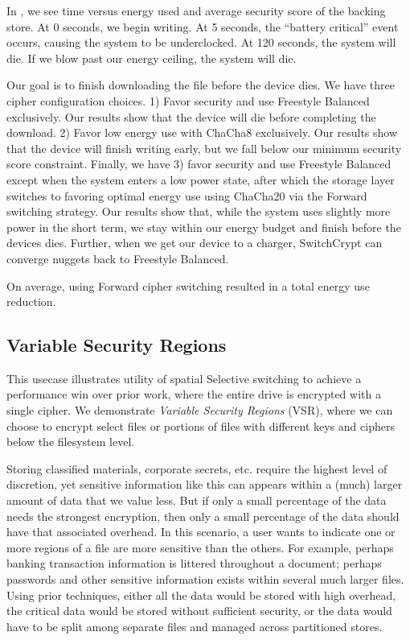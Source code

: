 In , we see time versus energy used and average security
score of the backing store. At 0 seconds, we begin writing. At 5 seconds, the
``battery critical'' event occurs, causing the system to be underclocked. At 120
seconds, the system will die. If we blow past our energy ceiling, the system
will die.

Our goal is to finish downloading the file before the device dies. We have three
cipher configuration choices. 1) Favor security and use Freestyle Balanced
exclusively. Our results show that the device will die before completing the
download. 2) Favor low energy use with ChaCha8 exclusively. Our results show
that the device will finish writing early, but we fall below our minimum
security score constraint. Finally, we have 3) favor security and use Freestyle
Balanced except when the system enters a low power state, after which the
storage layer switches to favoring optimal energy use using ChaCha20 via the
Forward switching strategy. Our results show that, while the system uses
slightly more power in the short term, we stay within our energy budget and
finish before the devices dies. Further, when we get our device to a charger,
SwitchCrypt can converge nuggets back to Freestyle Balanced.

On average, using Forward cipher switching resulted in a  total energy
use reduction.

\subsection{Variable Security Regions}\label{subsec:uc2}

This usecase illustrates utility of spatial Selective switching to achieve a
performance win over prior work, where the entire drive is encrypted with a
single cipher. We demonstrate \emph{Variable Security Regions} (VSR), where we
can choose to encrypt select files or portions of files with different keys and
ciphers below the filesystem level.

Storing classified materials, corporate secrets, etc. require the highest level
of discretion, yet sensitive information like this can appears within a (much)
larger amount of data that we value less. But if only a small percentage of the
data needs the strongest encryption, then only a small percentage of the data
should have that associated overhead. In this scenario, a user wants to indicate
one or more regions of a file are more sensitive than the others. For example,
perhaps banking transaction information is littered throughout a document;
perhaps passwords and other sensitive information exists within several much
larger files. Using prior techniques, either all the data would be stored with
high overhead, the critical data would be stored without sufficient security, or
the data would have to be split among separate files and managed across
partitioned stores.

